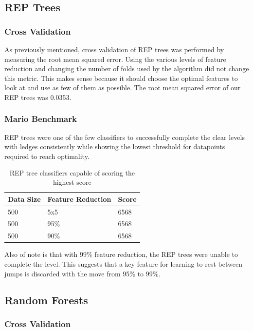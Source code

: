 \documentclass[]{article}   %
\begin{document}
\subsection{REP Trees}
\subsubsection{Cross Validation}
As previously mentioned, cross validation of REP trees was performed by measuring the root mean squared error. Using the various levels of feature
reduction and changing the number of folds used by the algorithm did not change this metric. This makes sense because it should choose the optimal
features to look at and use as few of them as possible. The root mean squared error of our REP trees was $0.0353$.

\subsubsection{Mario Benchmark}
REP trees were one of the few classifiers to successfully complete the clear levels with ledges consistently while showing the lowest threshold for
datapoints required to reach optimality. 

\begin{table}[h!]
	\begin{center}
		\caption{REP tree classifiers capable of scoring the highest score}
		\begin{tabular}{l | l || l  }
		\hline
		Data Size & Feature Reduction & Score \\
		\hline
		500 & 5x5 & 6568 \\
		500 & 95\% & 6568 \\
		500 & 90\% & 6568 \\
		\hline
		\end{tabular}
	\end{center}
\end{table}

Also of note is that with 99\% feature reduction, the REP trees were unable to complete the level. This suggests that a key feature for learning to 
rest between jumps is discarded with the move from 95\% to 99\%.

\subsection{Random Forests}
\subsubsection{Cross Validation}
\end{document}
